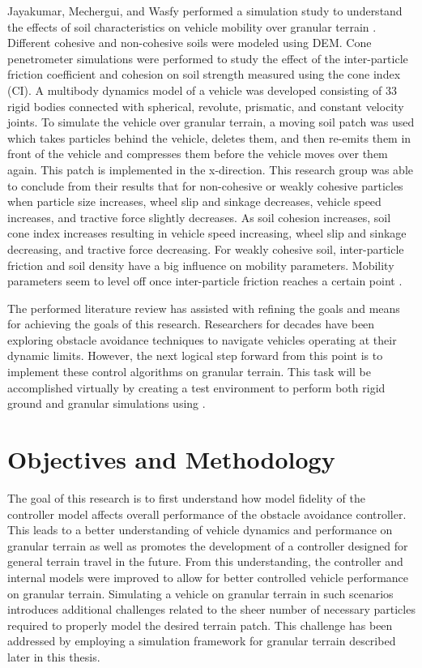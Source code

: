 \documentclass[12pt,onecolumn]{report}
\newcommand{\CHRONO}{{\sffamily{{Chrono}}}}
\begin{document}
Jayakumar, Mechergui, and Wasfy performed a simulation study to understand the effects of soil characteristics on vehicle mobility over granular terrain \cite{SoilCharacteristics2017}. Different cohesive and non-cohesive soils were modeled using DEM. Cone penetrometer simulations were performed to study the effect of the inter-particle friction coefficient and cohesion on soil strength measured using the cone index (CI). A multibody dynamics model of a vehicle was developed consisting of 33 rigid bodies connected with spherical, revolute, prismatic, and constant velocity joints. To simulate the vehicle over granular terrain, a moving soil patch was used which takes particles behind the vehicle, deletes them, and then re-emits them in front of the vehicle and compresses them before the vehicle moves over them again. This patch is implemented in the x-direction. This research group was able to conclude from their results that for non-cohesive or weakly cohesive particles when particle size increases, wheel slip and sinkage decreases, vehicle speed increases, and tractive force slightly decreases. As soil cohesion increases, soil cone index increases resulting in vehicle speed increasing, wheel slip and sinkage decreasing, and tractive force decreasing. For weakly cohesive soil, inter-particle friction and soil density have a big influence on mobility parameters. Mobility parameters seem to level off once inter-particle friction reaches a certain point \cite{SoilCharacteristics2017}.

The performed literature review has assisted with refining the goals and means for achieving the goals of this research. Researchers for decades have been exploring obstacle avoidance techniques to navigate vehicles operating at their dynamic limits. However, the next logical step forward from this point is to implement these control algorithms on granular terrain. This task will be accomplished virtually by creating a test environment to perform both rigid ground and granular simulations using {\CHRONO}. 


\section{Objectives and Methodology}\label{s:ObjectivesMethodology}

The goal of this research is to first understand how model fidelity of the controller model affects overall performance of the obstacle avoidance controller. This leads to a better understanding of vehicle dynamics and performance on granular terrain as well as promotes the development of a controller designed for general terrain travel in the future. From this understanding, the controller and internal models were improved to allow for better controlled vehicle performance on granular terrain. Simulating a vehicle on granular terrain in such scenarios introduces additional challenges related to the sheer number of necessary particles required to properly model the desired terrain patch. This challenge has been addressed by employing a simulation framework for granular terrain described later in this thesis.
\end{document}

